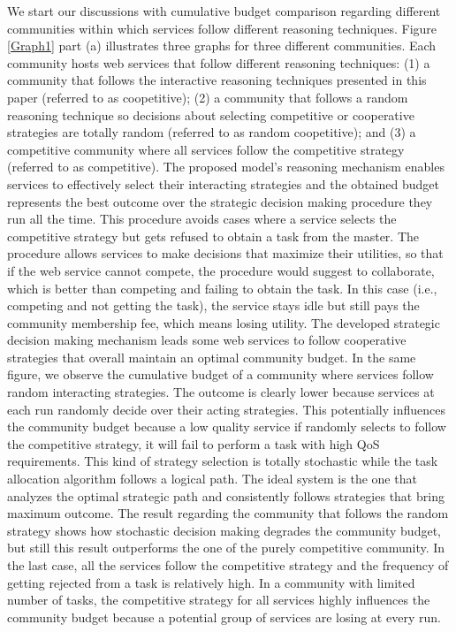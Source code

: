 \documentclass[runningheads,a4paper]{llncs}
\begin{document}
We start our discussions with cumulative budget comparison
regarding different communities within which services follow
different reasoning techniques. Figure \ref{Graph1} part (a)
illustrates three graphs for three different communities. Each
community hosts web services that follow different reasoning
techniques: (1) a community that follows the interactive reasoning
techniques presented in this paper (referred to as coopetitive);
(2) a community that follows a random reasoning technique so
decisions about selecting competitive or cooperative strategies
are totally random (referred to as random coopetitive); and (3) a
competitive community where all services follow the competitive
strategy (referred to as competitive). The proposed model's
reasoning mechanism enables services to effectively select their
interacting strategies and the obtained budget represents the best
outcome over the strategic decision making procedure they run all
the time. This procedure avoids cases where a service selects the
competitive strategy but gets refused to obtain a task from the
master. The procedure allows services to make decisions that
maximize their utilities, so that if the web service cannot
compete, the procedure would suggest to collaborate, which is
better than competing and failing to obtain the task. In this case
(i.e., competing and not getting the task), the service stays idle
but still pays the community membership fee, which means losing
utility. The developed strategic decision making mechanism leads
some web services to follow cooperative strategies that overall
maintain an optimal community budget. In the same figure, we
observe the cumulative budget of a community where services follow
random interacting strategies. The outcome is clearly lower
because services at each run randomly decide over their acting
strategies. This potentially influences the community budget
because a low quality service if randomly selects to follow the
competitive strategy, it will fail to perform a task with high QoS requirements. This kind of
strategy selection is totally stochastic while the task allocation
algorithm follows a logical path. The ideal system is the one that
analyzes the optimal strategic path and consistently follows
strategies that bring maximum outcome. The result regarding the
community that follows the random strategy shows how stochastic
decision making degrades the community budget, but still this
result outperforms the one of the purely competitive community. In
the last case, all the services follow the competitive strategy
and the frequency of getting rejected from a task is relatively
high. In a community with limited number of tasks, the competitive
strategy for all services highly influences the community budget
because a potential group of services are losing at every run.
\end{document}
